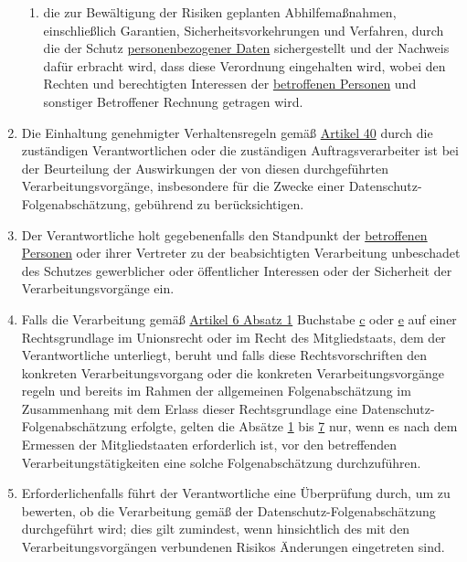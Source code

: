 \begin{enumerate}
\begin{enumerate}
    \item die zur Bewältigung der Risiken geplanten Abhilfemaßnahmen, einschließlich Garantien, Sicherheitsvorkehrungen
     und Verfahren, durch die der Schutz \hyperref[itm:04-1]{personenbezogener Daten} sichergestellt und der Nachweis dafür erbracht wird,
     dass diese Verordnung eingehalten wird, wobei den Rechten und berechtigten Interessen der \hyperref[itm:04-1]{betroffenen Personen} und
     sonstiger Betroffener Rechnung getragen wird.
    \label{itm:35-7d}

  \end{enumerate}

  \item Die Einhaltung genehmigter Verhaltensregeln gemäß \hyperref[ch:40]{Artikel 40} durch die zuständigen
   Verantwortlichen oder die zuständigen Auftragsverarbeiter ist bei der Beurteilung der Auswirkungen der von diesen
   durchgeführten Verarbeitungsvorgänge, insbesondere für die Zwecke einer Datenschutz-Folgenabschätzung, gebührend zu
   berücksichtigen.
  \label{itm:35-8}

  \item Der Verantwortliche holt gegebenenfalls den Standpunkt der \hyperref[itm:04-1]{betroffenen Personen} oder ihrer Vertreter zu der
   beabsichtigten Verarbeitung unbeschadet des Schutzes gewerblicher oder öffentlicher Interessen oder der Sicherheit
   der Verarbeitungsvorgänge ein.
  \label{itm:35-9}

  \item Falls die Verarbeitung gemäß \hyperref[itm:06-1]{Artikel 6 Absatz 1} Buchstabe \hyperref[itm:06-1c]
   {c} oder \hyperref[itm:06-1e]{e} auf einer Rechtsgrundlage im Unionsrecht oder im Recht des Mitgliedstaats, dem der
   Verantwortliche unterliegt, beruht und falls diese Rechtsvorschriften den konkreten Verarbeitungsvorgang oder die
   konkreten Verarbeitungsvorgänge regeln und bereits im Rahmen der allgemeinen Folgenabschätzung im Zusammenhang mit
   dem Erlass dieser Rechtsgrundlage eine Datenschutz-Folgenabschätzung erfolgte, gelten die Absätze \hyperref
   [itm:35-1]{1} bis \hyperref[itm:35-7]{7} nur, wenn es nach dem Ermessen der Mitgliedstaaten erforderlich ist, vor
   den betreffenden Verarbeitungstätigkeiten eine solche Folgenabschätzung durchzuführen.
  \label{itm:35-10}

  \item Erforderlichenfalls führt der Verantwortliche eine Überprüfung durch, um zu bewerten, ob die Verarbeitung gemäß
   der Datenschutz-Folgenabschätzung durchgeführt wird; dies gilt zumindest, wenn hinsichtlich des mit den
   Verarbeitungsvorgängen verbundenen Risikos Änderungen eingetreten sind.
  \label{itm:35-11}

\end{enumerate}


